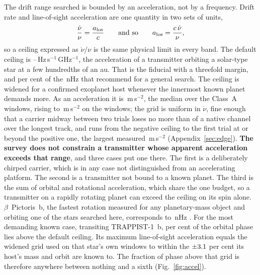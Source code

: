 The drift range searched is bounded by an acceleration, not by a frequency.
Drift rate and line-of-sight acceleration are one quantity in two sets of
units,
%
\begin{equation}
\frac{\dot\nu}{\nu}=\frac{a_{\rm los}}{c}
\qquad\text{and so}\qquad
a_{\rm los}=\frac{c\,\dot\nu}{\nu},
\label{eq:accel}
\end{equation}
%
so a ceiling expressed as $\dot\nu/\nu$ is the same physical limit in every
band. The default ceiling is \DriftCeilLo--\DriftCeilHi\,Hz\,s$^{-1}$\,GHz$^{-1}$,
the acceleration of a transmitter orbiting a solar-type star at a few
hundredths of an au. That is the \citet{Mason2025} fiducial with a threefold
margin, and \AccelSheikhPct{} per cent of the \AccelSheikhNHz\,nHz that
\citet{Sheikh2019} recommend for a general search. The ceiling is widened for
a confirmed exoplanet host whenever the innermost known planet demands more. As an acceleration it is
\AccelCeilMed\,m\,s$^{-2}$, the median over the Class~A windows, rising to
\AccelCeilMax\,m\,s$^{-2}$ on the \AccelNWide{} \AccelWideStar{} windows; the
grid is uniform in $\dot\nu$, fine enough that a carrier midway between two
trials loses no more than \DriftGridFineHalf{} of a native channel over the
longest track, and runs from the negative ceiling to the first trial at or
beyond the positive one, the largest measured
\EgTopMeasAAcc\,m\,s$^{-2}$ (Appendix~\ref{sec:edge}).
\textbf{The survey does not constrain a transmitter whose apparent acceleration
exceeds that range}, and three cases put one there. The first is a
deliberately chirped carrier, which is in any case not distinguished from an
accelerating platform. The second is a transmitter not bound to a known
planet. The third is the sum of orbital and rotational acceleration, which
share the one budget, so a transmitter on a rapidly rotating planet can exceed
the ceiling on its spin alone. $\beta$~Pictoris~b, the fastest rotation measured for any planetary-mass object
and orbiting one of the stars searched here, corresponds to
\AccelBpicRotNHz\,nHz \citep{Sheikh2019}. For the most demanding known case,
transiting TRAPPIST-1~b, \TrapPhaseHi{} per cent of the orbital phase lies
above the default ceiling. Its maximum line-of-sight acceleration equals
the widened grid used on that star's own windows to within the
$\pm3.1$ per cent its host's mass and orbit are known to. The
fraction of phase above that grid is therefore anywhere between nothing and a sixth
(Fig.~\ref{fig:accel}).

